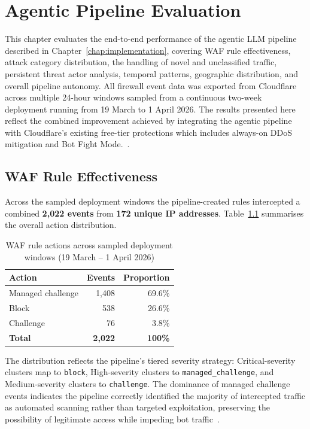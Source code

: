\documentclass[12pt, a4paper]{report}   %
\begin{document}
\chapter{Agentic Pipeline Evaluation}
\label{chap:pipeline-eval}

This chapter evaluates the end-to-end performance of the agentic LLM pipeline 
described in Chapter~\ref{chap:implementation}, covering WAF rule effectiveness, 
attack category distribution, the handling of novel and unclassified traffic, 
persistent threat actor analysis, temporal patterns, geographic distribution, and 
overall pipeline autonomy. All firewall event data was exported from Cloudflare 
across multiple 24-hour windows sampled from a continuous two-week deployment 
running from 19 March to 1 April 2026. The results presented here reflect the 
combined improvement achieved by integrating the agentic pipeline with 
Cloudflare's existing free-tier protections which includes always-on DDoS mitigation 
and Bot Fight Mode.~\cite{cf-api-lockdown}.

\section{WAF Rule Effectiveness}
\label{sec:waf-effectiveness}

Across the sampled deployment windows the pipeline-created
rules intercepted a combined \textbf{2,022 events} from
\textbf{172 unique IP addresses}. Table~\ref{tab:waf-actions}
summarises the overall action distribution.

\begin{table}[H]
\centering
\caption{WAF rule actions across sampled deployment windows
(19 March -- 1 April 2026)}
\label{tab:waf-actions}
\begin{tabular}{lrr}
\hline
\textbf{Action} & \textbf{Events} & \textbf{Proportion} \\
\hline
Managed challenge  & 1,408 & 69.6\% \\
Block              &   538 & 26.6\% \\
Challenge          &    76 &  3.8\% \\
\hline
\textbf{Total}     & \textbf{2,022} & \textbf{100\%} \\
\hline
\end{tabular}
\end{table}

The distribution reflects the pipeline's tiered severity
strategy: Critical-severity clusters map to \texttt{block},
High-severity clusters to \texttt{managed\_challenge}, and
Medium-severity clusters to \texttt{challenge}. The dominance
of managed challenge events indicates the pipeline correctly
identified the majority of intercepted traffic as automated
scanning rather than targeted exploitation, preserving the
possibility of legitimate access while impeding bot
traffic~\cite{cf-bot-fight}.
\end{document}
